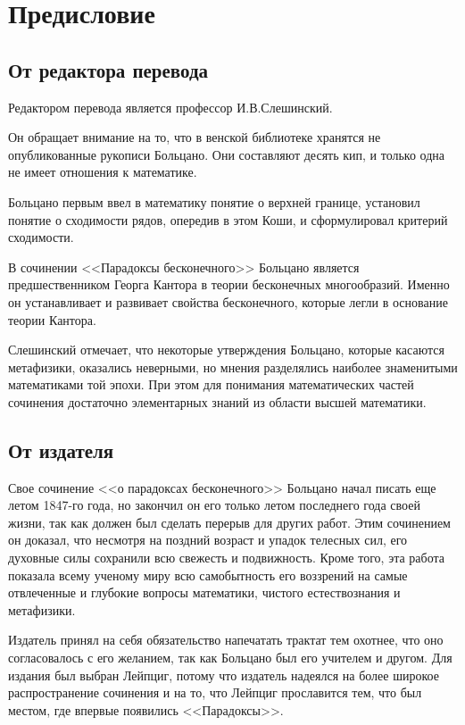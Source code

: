 \documentclass[12pt]{extarticle}
\begin{document}
\section{Предисловие}
\subsection{От редактора перевода}
Редактором перевода является профессор И.В.Слешинский. 

Он обращает внимание на то, что в венской библиотеке хранятся не опубликованные рукописи Больцано. Они составляют десять кип, и только одна не имеет отношения к математике. 

Больцано первым ввел в математику понятие о верхней границе, установил понятие о сходимости рядов, опередив в этом Коши, и сформулировал критерий сходимости.

В сочинении <<Парадоксы бесконечного>> Больцано является предшественником Георга Кантора в теории бесконечных многообразий. Именно он устанавливает и развивает свойства бесконечного, которые легли в основание теории Кантора.

Слешинский отмечает, что некоторые утверждения Больцано, которые касаются метафизики, оказались неверными, но мнения разделялись наиболее знаменитыми математиками той эпохи. При этом для понимания математических частей сочинения достаточно элементарных знаний из области высшей математики.

\subsection{От издателя}
Свое сочинение <<о парадоксах бесконечного>> Больцано начал писать еще летом 1847-го года, но закончил он его только летом последнего года своей жизни, так как должен был сделать перерыв для других работ. Этим сочинением он доказал, что несмотря на поздний возраст и упадок телесных сил, его духовные силы сохранили всю свежесть и подвижность.
Кроме того, эта работа показала всему ученому миру всю самобытность его воззрений на самые отвлеченные и глубокие вопросы математики, чистого естествознания и метафизики.

Издатель принял на себя обязательство напечатать трактат тем охотнее, что оно согласовалось с его желанием, так как Больцано был его учителем и другом. Для издания был выбран Лейпциг, потому что издатель надеялся на более широкое распространение сочинения и на то, что Лейпциг прославится тем, что был местом, где впервые появились <<Парадоксы>>. 
\end{document}

